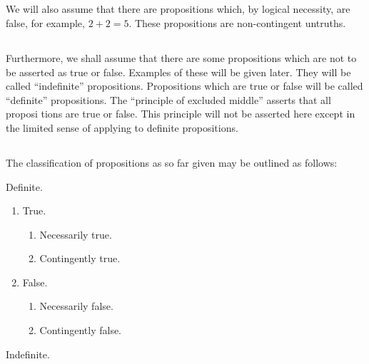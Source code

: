 \documentclass{book}
\begin{document}
\subsection{}
\label{sec:2.11}

We will also assume that there are propositions which, by logical necessity, are false, for example, \(2 + 2 = 5\).  These propositions are non-contingent untruths.

\subsection{}
\label{sec:2.12}

Furthermore, we shall assume that there are some propositions which are not to be asserted as true or false.  Examples of these will be given later.  They will be called “indefinite” propositions.  Propositions which are true or false will be called “definite” propositions.  The “principle of excluded middle” asserts that all proposi tions are true or false.  This principle will not be asserted here except in the limited sense of applying to definite propositions.

\subsection{}
\label{sec:2.13}

The classification of propositions as so far given may be outlined as follows:
\begin{abcd}
\item Definite.
  \begin{enumerate}
  \item True.
    \begin{enumerate}
    \item Necessarily true.
    \item Contingently true.
    \end{enumerate}
  \item False.
    \begin{enumerate}
    \item Necessarily false.
    \item Contingently false.
    \end{enumerate}
  \end{enumerate}
\item Indefinite.
\end{abcd}

\subsection{}
\label{sec:2.14}
\end{document}
